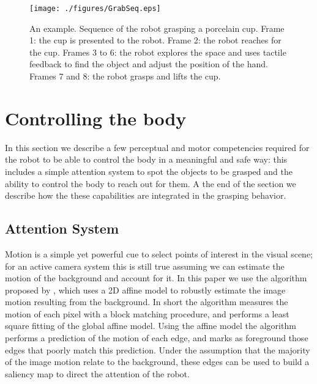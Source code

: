 \begin{figure}[tb]
\centerline{
\texttt{[image: ./figures/GrabSeq.eps]}
} \caption{An example. Sequence of the robot grasping a porcelain
cup. Frame 1: the cup is presented to the robot. Frame 2: the
robot reaches for the cup. Frames 3 to 6:  the robot explores the
space and uses tactile feedback to find the object and adjust the
position of the hand. Frames 7 and 8: the robot grasps
and lifts the cup.} \label{fig:sequence}
\end{figure}



\section{Controlling the body}
\label{sec:controlling}

In this section we describe a few perceptual and motor competencies required
for the robot to be able to control the body in a meaningful and safe way:
this includes a simple attention system to spot the objects to be grasped
and the ability to control the body to reach out for them. A the end of the
section we describe how the these capabilities are integrated in the grasping
behavior.

\subsection{Attention System}
Motion is a simple yet powerful cue to select points of interest
in the visual scene; for an active camera system this is still
true assuming we can estimate the motion of the background and
account for it. In this paper we use the algorithm proposed by
\cite{kemp-thesis}, which uses a 2D affine model to robustly
estimate the image motion resulting from the background. In short
the algorithm measures the motion of each pixel with a block
matching procedure, and performs a least square fitting of the
global affine model. Using the affine model the algorithm performs
a prediction of the motion of each edge, and marks as foreground
those edges that poorly match this prediction. Under the
assumption that the majority of the image motion relate to the
background, these edges can be used to build a saliency map to
direct the attention of the robot.

